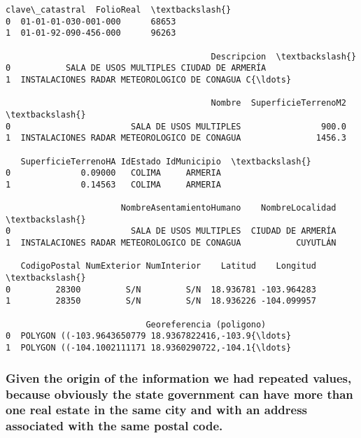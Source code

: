 \documentclass[11pt]{article}
\makeatletter
\newcommand{\boxspacing}{\kern\kvtcb@left@rule\kern\kvtcb@boxsep}
\newcommand{\prompt}[4]{
        \ttfamily\llap{{\color{#2}[#3]:\hspace{3pt}#4}}\vspace{-\baselineskip}
    }
\makeatother
\begin{document}
            \begin{tcolorbox}[breakable, size=fbox, boxrule=.5pt, pad at break*=1mm, opacityfill=0]
\prompt{Out}{outcolor}{11}{\boxspacing}
\begin{Verbatim}[commandchars=\\\{\}]
        clave\_catastral  FolioReal  \textbackslash{}
0  01-01-01-030-001-000      68653
1  01-01-92-090-456-000      96263

                                         Descripcion  \textbackslash{}
0           SALA DE USOS MULTIPLES CIUDAD DE ARMERÍA
1  INSTALACIONES RADAR METEOROLOGICO DE CONAGUA C{\ldots}

                                         Nombre  SuperficieTerrenoM2  \textbackslash{}
0                        SALA DE USOS MULTIPLES                900.0
1  INSTALACIONES RADAR METEOROLOGICO DE CONAGUA               1456.3

   SuperficieTerrenoHA IdEstado IdMunicipio  \textbackslash{}
0              0.09000   COLIMA     ARMERIA
1              0.14563   COLIMA     ARMERIA

                       NombreAsentamientoHumano    NombreLocalidad  \textbackslash{}
0                        SALA DE USOS MULTIPLES  CIUDAD DE ARMERÍA
1  INSTALACIONES RADAR METEOROLOGICO DE CONAGUA           CUYUTLÁN

   CodigoPostal NumExterior NumInterior    Latitud    Longitud  \textbackslash{}
0         28300         S/N         S/N  18.936781 -103.964283
1         28350         S/N         S/N  18.936226 -104.099957

                            Georeferencia (poligono)
0  POLYGON ((-103.9643650779 18.9367822416,-103.9{\ldots}
1  POLYGON ((-104.1002111171 18.9360290722,-104.1{\ldots}
\end{Verbatim}
\end{tcolorbox}
        
    \hypertarget{given-the-origin-of-the-information-we-had-repeated-values-because-obviously-the-state-government-can-have-more-than-one-real-estate-in-the-same-city-and-with-an-address-associated-with-the-same-postal-code.}{%
\subsubsection{Given the origin of the information we had repeated
values, because obviously the state government can have more than one
real estate in the same city and with an address associated with the
same postal
code.}\label{given-the-origin-of-the-information-we-had-repeated-values-because-obviously-the-state-government-can-have-more-than-one-real-estate-in-the-same-city-and-with-an-address-associated-with-the-same-postal-code.}}
\end{document}
